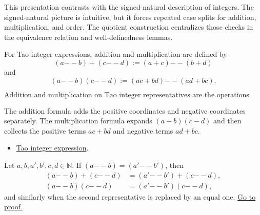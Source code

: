 \begin{remark*}[Exposition]
This presentation contrasts with the signed-natural description of integers.
The signed-natural picture is intuitive, but it forces repeated case splits
for addition, multiplication, and order. The quotient construction centralizes
those checks in the equivalence relation and well-definedness lemmas.
\end{remark*}

\DefinitionalRoot

\begin{definition}
\label{def:tao-integer-operations}
For Tao integer expressions, addition and multiplication are defined by
\[
  (a {-\!\!-} b) + (c {-\!\!-} d) := (a+c) {-\!\!-} (b+d)
\]
and
\[
  (a {-\!\!-} b)(c {-\!\!-} d) := (ac+bd) {-\!\!-} (ad+bc).
\]
\end{definition}




\begin{remark*}
\[
  \text{Addition and multiplication on Tao integer representatives are the
  operations forced by formal differences.}
\]
\end{remark*}

\begin{remark*}[Interpretation]
The addition formula adds the positive coordinates and negative coordinates
separately. The multiplication formula expands \((a-b)(c-d)\) and then
collects the positive terms \(ac+bd\) and negative terms \(ad+bc\).
\end{remark*}

\begin{dependencies}
\begin{itemize}
  \item \hyperref[def:tao-integer-expression]{Tao integer expression}.
\end{itemize}
\end{dependencies}

\begin{lemma}
\label{lem:int-well-defined}
Let \(a,b,a',b',c,d\in\mathbb{N}\). If
\((a {-\!\!-} b)=(a' {-\!\!-} b')\), then
\begin{align*}
  (a {-\!\!-} b) + (c {-\!\!-} d)
    &= (a' {-\!\!-} b') + (c {-\!\!-} d), \\
  (a {-\!\!-} b)(c {-\!\!-} d)
    &= (a' {-\!\!-} b')(c {-\!\!-} d),
\end{align*}
and similarly when the second representative is replaced by an equal one.
\hyperref[prf:int-well-defined]{Go to proof.}
\end{lemma}


